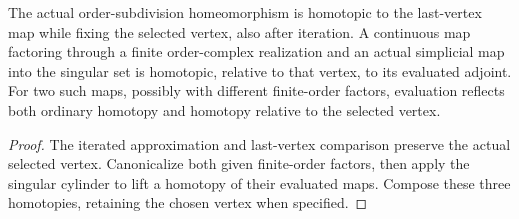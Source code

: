 \begin{proposition}
  \label{prop:actual-singular-based-order-canonicalization}
  \leanok
  The actual order-subdivision homeomorphism is homotopic to the last-vertex map while fixing the selected vertex, also after iteration. A continuous map factoring through a finite order-complex realization and an actual simplicial map into the singular set is homotopic, relative to that vertex, to its evaluated adjoint. For two such maps, possibly with different finite-order factors, evaluation reflects both ordinary homotopy and homotopy relative to the selected vertex.
\end{proposition}
\begin{proof}
  The iterated approximation and last-vertex comparison preserve the actual selected vertex. Canonicalize both given finite-order factors, then apply the singular cylinder to lift a homotopy of their evaluated maps. Compose these three homotopies, retaining the chosen vertex when specified.
  \leanok
\end{proof}

